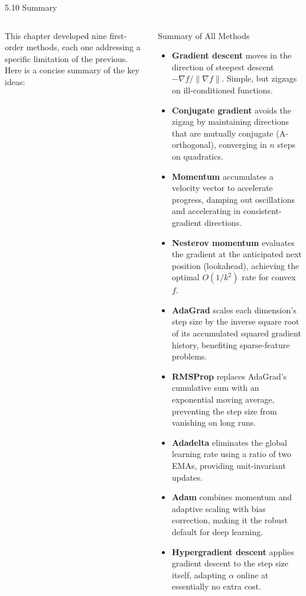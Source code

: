 \documentclass[aspectratio=169,10pt]{beamer}
\begin{document}
\begin{frame}[allowframebreaks]{5.10 Summary}

  \begin{columns}[T]
      This chapter developed nine first-order methods, each one
      addressing a specific limitation of the previous.  Here
      is a concise summary of the key ideas:

      \begin{block}{Summary of All Methods}
        \begin{itemize}
          \item \textbf{Gradient descent} moves in the direction
                of steepest descent $-\nabla f/\|\nabla f\|$.
                Simple, but zigzags on ill-conditioned functions.
          \item \textbf{Conjugate gradient} avoids the zigzag by
                maintaining directions that are mutually conjugate
                (A-orthogonal), converging in $n$ steps on quadratics.
          \item \textbf{Momentum} accumulates a velocity vector to
                accelerate progress, damping out oscillations and
                accelerating in consistent-gradient directions.
          \item \textbf{Nesterov momentum} evaluates the gradient
                at the anticipated next position (lookahead),
                achieving the optimal $O(1/k^2)$ rate for convex $f$.
          \item \textbf{AdaGrad} scales each dimension's step size
                by the inverse square root of its accumulated squared
                gradient history, benefiting sparse-feature problems.
          \item \textbf{RMSProp} replaces AdaGrad's cumulative sum
                with an exponential moving average, preventing
                the step size from vanishing on long runs.
          \item \textbf{Adadelta} eliminates the global learning rate
                using a ratio of two EMAs, providing unit-invariant
                updates.
          \item \textbf{Adam} combines momentum and adaptive scaling
                with bias correction, making it the robust default
                for deep learning.
          \item \textbf{Hypergradient descent} applies gradient
                descent to the step size itself, adapting $\alpha$
                online at essentially no extra cost.
        \end{itemize}
      \end{block}


\end{columns}
\end{frame}
\end{document}
